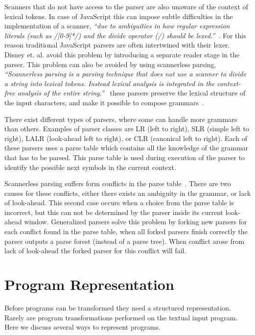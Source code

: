 Scanners that do not have access to the parser are also unaware of the context of lexical tokens. In case of JavaScript this can impose subtle difficulties in the implementation of a scanner, \textit{``due to ambiguities in how regular expression literals (such as /[0-9]*/) and the divide operator (/) should be lexed.''}~\cite{Disney2014}. For this reason traditional JavaScript parsers are often intertwined with their lexer. Disney et. al. avoid this problem by introducing a separate reader stage in the parser. This problem can also be avoided by using scannerless parsing, \textit{``Scannerless parsing is a parsing technique that does not use a scanner to divide a string into lexical tokens. Instead lexical analysis is integrated in the context-free analysis of the entire string.''}~\cite{Visser1997} these parsers preserve the lexical structure of the input characters, and make it possible to compose grammars~\cite{Visser1997}.

There exist different types of parsers, where some can handle more grammars than others. Examples of parser classes are LR (left to right), SLR (simple left to right), LALR (look-ahead left to right), or CLR (canonical left to right). Each of these parsers uses a parse table which contains all the knowledge of the grammar that has to be parsed. This parse table is used during execution of the parser to identify the possible next symbols in the current context.

Scannerless parsing suffers form conflicts in the parse table~\cite{Visser1997}. There are two causes for these conflicts, either there exists an ambiguity in the grammar, or lack of look-ahead. This second case occurs when a choice from the parse table is incorrect, but this can not be determined by the parser inside its current look-ahead window. Generalized parsers solve this problem by forking new parsers for each conflict found in the parse table, when all forked parsers finish correctly the parser outputs a parse forest (instead of a parse tree). When conflict arose from lack of look-ahead the forked parser for this conflict will fail.

\section{Program Representation} \label{program-representation}
Before programs can be transformed they need a structured representation. Rarely are program transformations performed on the textual input program. Here we discuss several ways to represent programs.

